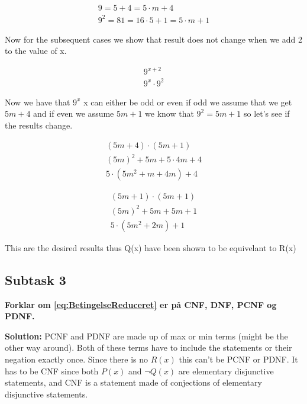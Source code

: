 \begin{equation}
    \begin{aligned}
        9=5+4=5 \cdot m+4 \\
        9^2=81=16 \cdot 5+1=5 \cdot m+1
    \end{aligned}
\end{equation}

Now for the subsequent cases we show that result does not change when we add 2 to the value of x.

\begin{equation}
    \begin{aligned}
        9^{x+2} \\
        9^x \cdot 9^2
    \end{aligned}
\end{equation} 

Now we have that $9^x$ x can either be odd or even if odd we assume that we get $5m+4$ and if even we assume $5m+1$ we know that $9^2=5m+1$ so let's see if the results change.

\begin{equation}
    \begin{aligned}
        (5m + 4) \cdot (5m + 1) \\ 
        (5m)^2 + 5m + 5 \cdot 4m + 4 \\
        5 \cdot (5m^2 + m + 4m) + 4
    \end{aligned}
\end{equation} 

\begin{equation}
    \begin{aligned}
        (5m + 1) \cdot (5m + 1) \\ 
        (5m)^2 + 5m + 5m + 1 \\
        5 \cdot (5m^2 + 2m) + 1
    \end{aligned}
\end{equation} 

This are the desired results thus Q(x) have been shown to be equivelant to R(x)

\subsection{Subtask 3}
\noindent
\textbf{Forklar om \eqref{eq:BetingelseReduceret} er på CNF, DNF, PCNF og PDNF.}

\bigskip
\noindent
\textbf{Solution:} PCNF and PDNF are made up of max or min terms (might be the other way around). Both of these terms have to include the statements or their negation exactly once. Since there is no $R(x)$ this can't be PCNF or PDNF. It has to be CNF since both $P(x)$ and $\neg Q(x)$ are elementary disjunctive statements, and CNF is a statement made of conjections of elementary disjunctive statements. 
